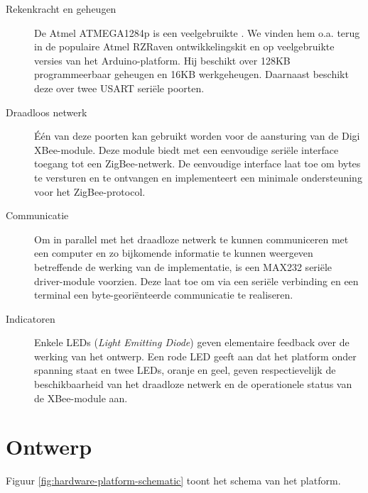 \begin{description}

  \item[Rekenkracht en geheugen] De Atmel ATMEGA1284p is een veelgebruikte
  \mcu. We vinden hem o.a. terug in de populaire Atmel RZRaven ontwikkelingskit
  en op veelgebruikte versies van het Arduino-platform. Hij beschikt over 128KB
  programmeerbaar geheugen en 16KB werkgeheugen. Daarnaast beschikt deze \mcu
  over twee USART seri\"ele poorten.
  
  \item[Draadloos netwerk] \'E\'en van deze poorten kan gebruikt worden voor de
  aansturing van de Digi XBee-module. Deze module biedt met een eenvoudige
  seri\"ele interface toegang tot een ZigBee-netwerk. De eenvoudige interface
  laat toe om bytes te versturen en te ontvangen en implementeert een minimale
  ondersteuning voor het ZigBee-protocol.
  
  \item[Communicatie] Om in parallel met het draadloze netwerk te kunnen
  communiceren met een computer en zo bijkomende informatie te kunnen weergeven
  betreffende de werking van de implementatie, is een MAX232 seri\"ele
  driver-module voorzien. Deze laat toe om via een seri\"ele verbinding en een
  terminal een byte-geori\"enteerde communicatie te realiseren.
  
  \item[Indicatoren] Enkele LEDs (\emph{Light Emitting Diode}) geven
  elementaire feedback over de werking van het ontwerp. Een rode LED geeft aan
  dat het platform onder spanning staat en twee LEDs, oranje en geel, geven
  respectievelijk de beschikbaarheid van het draadloze netwerk en de
  operationele status van de XBee-module aan.
  
\end{description}

\section{Ontwerp}

Figuur \ref{fig:hardware-platform-schematic} toont het schema van het platform.

